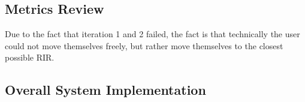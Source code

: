 \documentclass[../../main.tex]{subfiles}
\begin{document}













		\subsection{Metrics Review}

		Due to the fact that iteration 1 and 2 failed, the fact is that technically the user could not move themselves freely, but rather move themselves to the closest possible \ac{RIR}.

		\subsection{Overall System Implementation}
\end{document}

